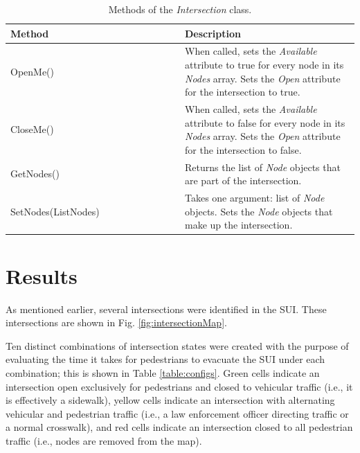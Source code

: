 \documentclass[12pt]{article}
\begin{document}
\def\arraystretch{1.5}
\begin{table}
  \centering
    \begin{tabular}{p{0.5\linewidth}p{0.5\linewidth}}
     \hline
     Method & Description \\
     \hline
     OpenMe()  & When called, sets the \textit{Available} attribute to
                 true for every node in its \textit{Nodes} array. Sets the
                 \textit{Open} attribute for the intersection to true. \\
     CloseMe() & When called, sets the \textit{Available} attribute to
                 false for every node in its \textit{Nodes} array. Sets the
                 \textit{Open} attribute for the intersection to false. \\
     GetNodes() & Returns the list of \textit{Node} objects that are part of the
                  intersection. \\
     SetNodes(ListNodes) & Takes one argument: list of \textit{Node} objects.
                           Sets the \textit{Node} objects that make up the
                           intersection. \\
     \hline
    \end{tabular}
    \caption{Methods of the \textit{Intersection} class.}
    \label{table:intersection_methods}
\end{table}

\section{Results}
As mentioned earlier, several intersections were identified in the SUI.  These
intersections are shown in Fig. \ref{fig:intersectionMap}.

Ten distinct combinations of intersection states were created with the purpose
of evaluating the time it takes for pedestrians to evacuate the SUI under each
combination; this is shown in Table \ref{table:configs}.  Green cells indicate
an intersection open exclusively for pedestrians and closed to vehicular traffic (i.e., it is effectively a sidewalk),
yellow cells indicate an intersection with alternating vehicular and pedestrian
traffic (i.e., a law enforcement officer directing traffic or a normal crosswalk), and red cells indicate
an intersection closed to all pedestrian traffic (i.e., nodes are removed from
the map).
\end{document}
